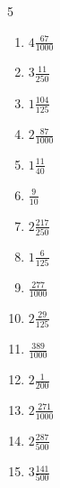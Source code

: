 \documentclass[12pt]{article}
\begin{document}
\begin{multicols}{5}
\begin{enumerate}
\item $ 4 \frac{67}{1000} $
\item $ 3 \frac{11}{250} $
\item $ 1 \frac{104}{125} $
\item $ 2 \frac{87}{1000} $
\item $ 1 \frac{11}{40} $
\item $ \frac{9}{10} $
\item $ 2 \frac{217}{250} $
\item $ 1 \frac{6}{125} $
\item $ \frac{277}{1000} $
\item $ 2 \frac{29}{125} $
\item $ \frac{389}{1000} $
\item $ 2 \frac{1}{200} $
\item $ 2 \frac{271}{1000} $
\item $ 2 \frac{287}{500} $
\item $ 3 \frac{141}{500} $
\end{enumerate}\end{multicols}\newpage
\end{document}
